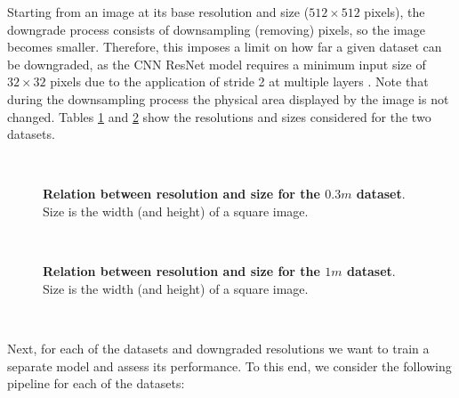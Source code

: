 Starting from an image at its base resolution and size ($512\times512$ pixels), the downgrade process consists of downsampling (removing) pixels, so the image becomes smaller. Therefore, this imposes a limit on how far a given dataset can be downgraded, as the CNN ResNet model requires a minimum input size of $32\times32$ pixels due to the application of stride 2 at multiple layers \parencite{ResNetKeras}. Note that during the downsampling process the physical area displayed by the image is not changed. Tables \ref{tab:resolutions_03m} and \ref{tab:resolutions_1m} show the resolutions and sizes considered for the two datasets.

\

\begin{figure}[H]
	\centering
	
	\captionsetup{width=1\linewidth}
	\caption{\textbf{Relation between resolution and size for the $0.3m$ dataset}. Size is the width (and height) of a square image.}
	\label{tab:resolutions_03m}
\end{figure}

\

\begin{figure}[H]
	\centering
	
	\captionsetup{width=1\linewidth}
	\caption{\textbf{Relation between resolution and size for the $1m$ dataset}. Size is the width (and height) of a square image.}
	\label{tab:resolutions_1m}
\end{figure}

\

Next, for each of the datasets and downgraded resolutions we want to train a separate model and assess its performance. To this end, we consider the following pipeline for each of the datasets:


